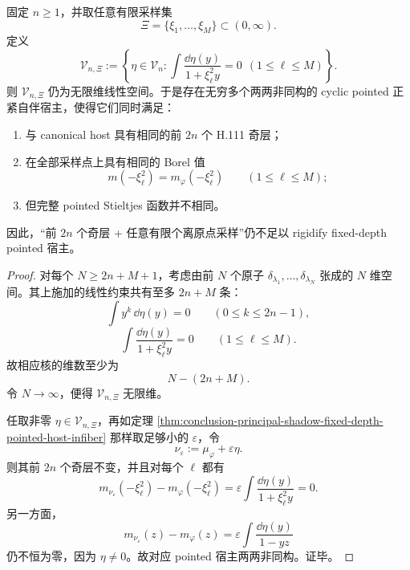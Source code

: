 \begin{corollary}\label{cor:conclusion-principal-shadow-finite-offorigin-borel-not-rigid}
固定 \(n\ge 1\)，并取任意有限采样集
\[
\Xi=\{\xi_1,\dots,\xi_M\}\subset(0,\infty).
\]
定义
\[
\mathcal V_{n,\Xi}
:=
\left\{
\eta\in\mathcal V_n:
\int\frac{\dd\eta(y)}{1+\xi_\ell^2y}=0
\ \ (1\le \ell\le M)
\right\}.
\]
则 \(\mathcal V_{n,\Xi}\) 仍为无限维线性空间。于是存在无穷多个两两非同构的 cyclic pointed 正紧自伴宿主，使得它们同时满足：
\begin{enumerate}
\item 与 canonical host 具有相同的前 \(2n\) 个 H.111 奇层；
\item 在全部采样点上具有相同的 Borel 值
\[
m(-\xi_\ell^2)=m_\varphi(-\xi_\ell^2)
\qquad
(1\le \ell\le M);
\]
\item 但完整 pointed Stieltjes 函数并不相同。
\end{enumerate}
因此，“前 \(2n\) 个奇层 + 任意有限个离原点采样”仍不足以 rigidify fixed-depth pointed 宿主。
\end{corollary}
\begin{proof}
对每个 \(N\ge 2n+M+1\)，考虑由前 \(N\) 个原子 \(\delta_{\lambda_1},\dots,\delta_{\lambda_N}\) 张成的 \(N\) 维空间。其上施加的线性约束共有至多 \(2n+M\) 条：
\[
\int y^k\,\dd\eta(y)=0
\qquad (0\le k\le 2n-1),
\]
\[
\int\frac{\dd\eta(y)}{1+\xi_\ell^2y}=0
\qquad (1\le \ell\le M).
\]
故相应核的维数至少为
\[
N-(2n+M).
\]
令 \(N\to\infty\)，便得 \(\mathcal V_{n,\Xi}\) 无限维。

任取非零 \(\eta\in\mathcal V_{n,\Xi}\)，再如定理 \ref{thm:conclusion-principal-shadow-fixed-depth-pointed-host-infiber} 那样取足够小的 \(\varepsilon\)，令
\[
\nu_\varepsilon:=\mu_\varphi+\varepsilon\eta.
\]
则其前 \(2n\) 个奇层不变，并且对每个 \(\ell\) 都有
\[
m_{\nu_\varepsilon}(-\xi_\ell^2)-m_\varphi(-\xi_\ell^2)
=
\varepsilon\int\frac{\dd\eta(y)}{1+\xi_\ell^2y}
=
0.
\]
另一方面，
\[
m_{\nu_\varepsilon}(z)-m_\varphi(z)
=
\varepsilon\int\frac{\dd\eta(y)}{1-yz}
\]
仍不恒为零，因为 \(\eta\neq 0\)。故对应 pointed 宿主两两非同构。证毕。
\end{proof}

